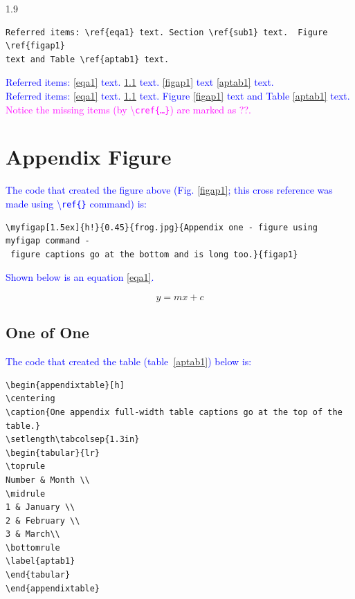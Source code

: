 \documentclass[phd]{ndsu-thesis-2022}
\newcommand\myspacing{1.9}      %
\newcommand\italk[1]{\textcolor{blue}{#1}}  %
\newcommand\cmd[1]{\textbackslash\texttt{#1}}  %
\begin{document}
\begin{spacing}{\myspacing}
{\begin{verbatim}
Referred items: \ref{eqa1} text. Section \ref{sub1} text.  Figure \ref{figap1} 
text and Table \ref{aptab1} text.
\end{verbatim}
}

\italk{Referred items: \cref{eqa1} text. \cref{sub1} text.  \cref{figap1} text \cref{aptab1} text. \\
Referred items: \ref{eqa1} text. \ref{sub1} text.  Figure \ref{figap1} text and Table \ref{aptab1} text.
\\ \textcolor{magenta}{Notice the missing items (by \cmd{cref\{\ldots\}}) are marked as ??.}}

\section{Appendix Figure}


\italk{The code that created the figure above (Fig. \ref{figap1}; this cross reference was made using \cmd{ref\{\}} command) is:}

{\onehalfspacing
\begin{verbatim}
\myfigap[1.5ex]{h!}{0.45}{frog.jpg}{Appendix one - figure using myfigap command -
 figure captions go at the bottom and is long too.}{figap1}
\end{verbatim}
}

\italk{Shown below is an equation \cref{eqa1}. } 
 
\vspace{-4ex}
\begin{equation}
y = mx + c
\label{eqa1}
\end{equation}

\subsection{One of One}
\label{sub1}
\kant[2]

\italk{The code that created the table (table~\ref{aptab1}) below is:}

{\onehalfspacing
\begin{verbatim}
\begin{appendixtable}[h]
\centering
\caption{One appendix full-width table captions go at the top of the table.}
\setlength\tabcolsep{1.3in}
\begin{tabular}{lr}
\toprule
Number & Month \\
\midrule
1 & January \\
2 & February \\
3 & March\\
\bottomrule
\label{aptab1}
\end{tabular}
\end{appendixtable}
\end{verbatim}
}


\end{spacing}
\end{document}
